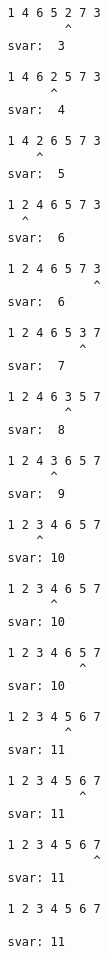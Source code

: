 { \begin{verbatim}
                1 4 6 5 2 7 3
                        ^
                svar:  3
\end{verbatim}}
{ \begin{verbatim}
                1 4 6 2 5 7 3
                      ^
                svar:  4
\end{verbatim}}
{ \begin{verbatim}
                1 4 2 6 5 7 3
                    ^
                svar:  5
\end{verbatim}}
{ \begin{verbatim}
                1 2 4 6 5 7 3
                  ^
                svar:  6
\end{verbatim}}
{ \begin{verbatim}
                1 2 4 6 5 7 3
                            ^
                svar:  6
\end{verbatim}}
{ \begin{verbatim}
                1 2 4 6 5 3 7
                          ^
                svar:  7
\end{verbatim}}
{ \begin{verbatim}
                1 2 4 6 3 5 7
                        ^
                svar:  8
\end{verbatim}}
{ \begin{verbatim}
                1 2 4 3 6 5 7
                      ^
                svar:  9
\end{verbatim}}
{ \begin{verbatim}
                1 2 3 4 6 5 7
                    ^
                svar: 10
\end{verbatim}}
{ \begin{verbatim}
                1 2 3 4 6 5 7
                      ^
                svar: 10
\end{verbatim}}
{ \begin{verbatim}
                1 2 3 4 6 5 7
                          ^
                svar: 10
\end{verbatim}}
{ \begin{verbatim}
                1 2 3 4 5 6 7
                        ^
                svar: 11
\end{verbatim}}
{ \begin{verbatim}
                1 2 3 4 5 6 7
                          ^
                svar: 11
\end{verbatim}}
{ \begin{verbatim}
                1 2 3 4 5 6 7
                            ^
                svar: 11
\end{verbatim}}
{ \begin{verbatim}
                1 2 3 4 5 6 7

                svar: 11
\end{verbatim}}
